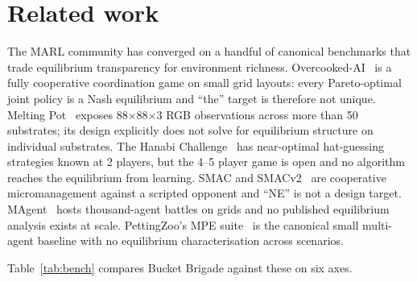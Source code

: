 \documentclass{anvil-paper}
\begin{document}
\section{Related work}
\label{sec:related}

The MARL community has converged on a handful of canonical benchmarks that
trade equilibrium transparency for environment richness.
Overcooked-AI~\citep{overcooked2019} is a fully cooperative coordination
game on small grid layouts: every Pareto-optimal joint policy is a Nash
equilibrium and ``the'' target is therefore not unique. Melting
Pot~\citep{meltingpot2021} exposes 88$\times$88$\times$3 RGB observations
across more than 50 substrates; its design explicitly does not solve for
equilibrium structure on individual substrates. The Hanabi
Challenge~\citep{hanabi2020} has near-optimal hat-guessing strategies known
at 2 players, but the 4--5 player game is open and no algorithm reaches the
equilibrium from learning. SMAC and SMACv2~\citep{smac2019,smacv2_2023} are
cooperative micromanagement against a scripted opponent and ``NE'' is not a
design target. MAgent~\citep{magent2018} hosts thousand-agent battles on
grids and no published equilibrium analysis exists at scale.
PettingZoo's MPE suite~\citep{pettingzoo2021} is the canonical small
multi-agent baseline with no equilibrium characterisation across scenarios.

Table~\ref{tab:bench} compares Bucket Brigade against these on six axes.
\end{document}
